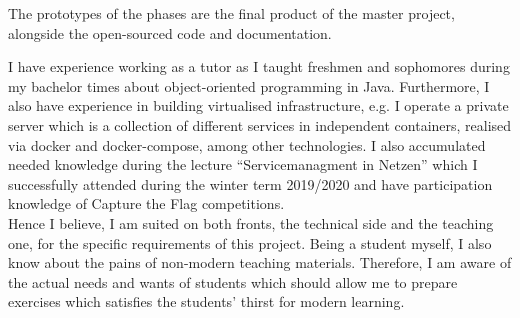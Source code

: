 The prototypes of the phases are the final product of the master project, alongside the open-sourced code and documentation.

I have experience working as a tutor as I taught freshmen and sophomores during my bachelor times about object-oriented programming in Java.
Furthermore, I also have experience in building virtualised infrastructure, e.g. I operate a private server which is a collection of different services in independent containers, realised via docker and docker-compose, among other technologies.
I also accumulated needed knowledge during the lecture \enquote{Servicemanagment in Netzen} which I successfully attended during the winter term 2019/2020 and have participation knowledge of Capture the Flag competitions. \\
Hence I believe, I am suited on both fronts, the technical side and the teaching one, for the specific requirements of this project.
Being a student myself, I also know about the pains of non-modern teaching materials.
Therefore, I am aware of the actual needs and wants of students which should allow me to prepare exercises which satisfies the students' thirst for modern learning.